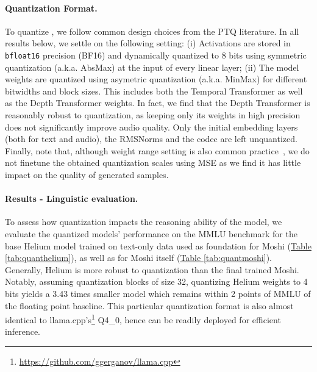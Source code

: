 \paragraph{Quantization Format.} To quantize \ours{}, we follow common design choices from the PTQ literature. In all results below, we settle on the following setting: (i) Activations are stored in \texttt{bfloat16} precision (BF16) and dynamically quantized to 8 bits using symmetric quantization (a.k.a. AbsMax) at the input of every linear layer; 
(ii) The model weights are quantized using asymetric quantization (a.k.a. MinMax) for different bitwidths and block sizes. This includes both the Temporal Transformer as well as the Depth Transformer weights. In fact, we find that the Depth Transformer is reasonably robust to quantization, as keeping only its weights in high precision does not significantly improve audio quality.
Only the initial embedding layers (both for text and audio), the RMSNorms and the \mimi codec are left unquantized. 
Finally, note that, although weight range setting is also common practice~\citep{nagel2021whitepaperneuralnetwork}, we do not finetune the obtained quantization scales using MSE as we find it has little impact on the quality of generated samples. %
\paragraph{Results - Linguistic evaluation.}
To assess how quantization impacts the reasoning ability of the model, we evaluate the quantized models' performance on the MMLU benchmark for the base Helium model trained on text-only data used as foundation for Moshi (\hyperref[tab:quanthelium]{Table \ref{tab:quanthelium}}), as well as for Moshi itself (\hyperref[tab:quantmoshi]{Table \ref{tab:quantmoshi}}).  
Generally,  Helium is more robust to quantization than the final trained Moshi. 
Notably, assuming quantization blocks of size 32, quantizing Helium weights to 4 bits yields a 3.43 times smaller model which remains within 2 points of MMLU of the floating point baseline. This particular quantization format is also almost identical to llama.cpp's\footnote{\url{https://github.com/ggerganov/llama.cpp}} Q4\_0, hence can be readily deployed for efficient inference.

